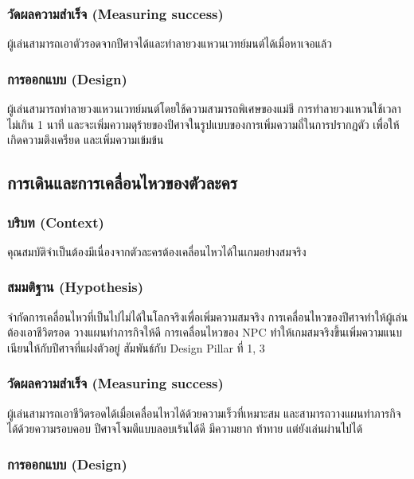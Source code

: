 \subsubsection{วัดผลความสำเร็จ (Measuring success)}

ผู้เล่นสามารถเอาตัวรอดจากปีศาจได้และทำลายวงแหวนเวทย์มนต์ได้เมื่อหาเจอแล้ว

\subsubsection{การออกแบบ (Design)}

ผู้เล่นสามารถทำลายวงแหวนเวทย์มนต์โดยใช้ความสามารถพิเศษของแม่ชี การทำลายวงแหวนใช้เวลาไม่เกิน 1 นาที และจะเพิ่มความดุร้ายของปีศาจในรูปแบบของการเพิ่มความถี่ในการปรากฎตัว เพื่อให้เกิดความตึงเครียด และเพิ่มความเข้มข้น

\subsection{การเดินและการเคลื่อนไหวของตัวละคร}

\subsubsection{บริบท (Context)}

คุณสมบัติจำเป็นต้องมีเนื่องจากตัวละครต้องเคลื่อนไหวได้ในเกมอย่างสมจริง

\subsubsection{สมมติฐาน (Hypothesis)}
จำกัดการเคลื่อนไหวที่เป็นไปไม่ได้ในโลกจริงเพื่อเพิ่มความสมจริง การเคลื่อนไหวของปีศาจทำให้ผู้เล่นต้องเอาชีวิตรอด วางแผนทำภารกิจให้ดี การเคลื่อนไหวของ NPC ทำให้เกมสมจริงขึ้นเพิ่มความแนบเนียนให้กับปีศาจที่แฝงตัวอยู่ สัมพันธ์กับ Design Pillar ที่ 1, 3

\subsubsection{วัดผลความสำเร็จ (Measuring success)}

ผู้เล่นสามารถเอาชีวิตรอดได้เมื่อเคลื่อนไหวได้ด้วยความเร็วที่เหมาะสม และสามารถวางแผนทำภารกิจได้ด้วยความรอบคอบ ปีศาจโจมตีแบบลอบเร้นได้ดี มีความยาก ท้าทาย แต่ยังเล่นผ่านไปได้

\subsubsection{การออกแบบ (Design)}

